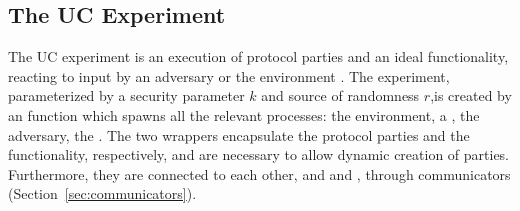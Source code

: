 
\subsection{The UC Experiment}
The UC experiment is an execution of protocol parties and an ideal functionality, reacting to input by an adversary \A or the environment \Z.
The experiment, parameterized by a security parameter $k$ and source of randomness $r$,is created by an  function  which spawns all the relevant processes: the environment, a \partywrapper, the adversary, the \fwrapper.
The two wrappers encapsulate the protocol parties and the functionality, respectively, and are necessary to allow dynamic creation of parties. Furthermore, they are connected to each other, and \Z and \A, through communicators (Section~\ref{sec:communicators}).

